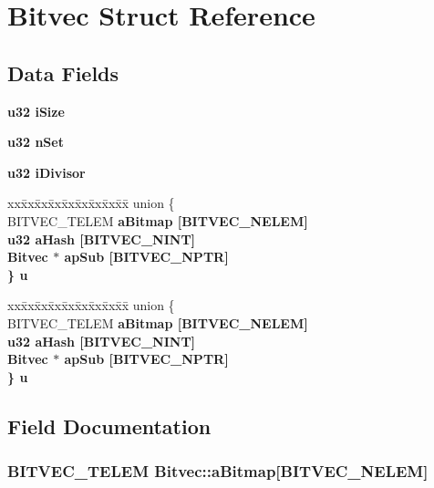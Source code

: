 \section{Bitvec Struct Reference}
\label{structBitvec}
\subsection*{Data Fields}
\begin{CompactItemize}
\item 
\bf{u32} \bf{i\-Size}
\item 
\bf{u32} \bf{n\-Set}
\item 
\bf{u32} \bf{i\-Divisor}
\item 
\begin{tabbing}
xx\=xx\=xx\=xx\=xx\=xx\=xx\=xx\=xx\=\kill
union \{\\
\>BITVEC\_TELEM \bf{aBitmap} [BITVEC\_NELEM]\\
\>\bf{u32} \bf{aHash} [BITVEC\_NINT]\\
\>\bf{Bitvec} $\ast$ \bf{apSub} [BITVEC\_NPTR]\\
\} \bf{u}\\

\end{tabbing}\item 
\begin{tabbing}
xx\=xx\=xx\=xx\=xx\=xx\=xx\=xx\=xx\=\kill
union \{\\
\>BITVEC\_TELEM \bf{aBitmap} [BITVEC\_NELEM]\\
\>\bf{u32} \bf{aHash} [BITVEC\_NINT]\\
\>\bf{Bitvec} $\ast$ \bf{apSub} [BITVEC\_NPTR]\\
\} \bf{u}\\

\end{tabbing}\end{CompactItemize}


\subsection{Field Documentation}
\subsubsection{\setlength{\rightskip}{0pt plus 5cm}BITVEC\_\-TELEM \bf{Bitvec::a\-Bitmap}[BITVEC\_\-NELEM]}\label{structBitvec_d631816240220fc07f8eff6fa7dbf889}


